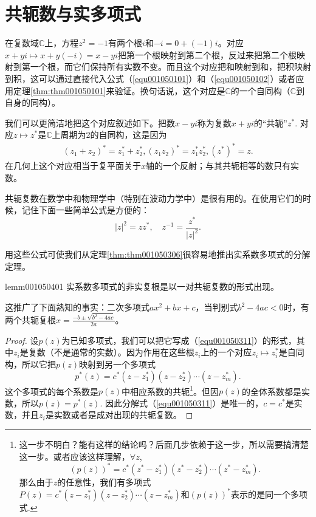 \section{共轭数与实多项式}\label{section0010504}
在复数域$\mathbb{C}$上，方程$z^2=-1$有两个根$i$和$-i=0+(-1)i$。对应$x+yi \mapsto x+y(-i)=x-yi$把第一个根映射到第二个根，反过来把第二个根映射到第一个根，而它们保持所有实数不变。而且这个对应把和映射到和，把积映射到积，这可以通过直接代入公式（\ref{equ001050101}）和（\ref{equ001050102}）或者应用定理\ref{thm:thm001050101}来验证。换句话说，这个对应是$\mathbb{C}$的一个自同构（$\mathbb{C}$到自身的同构）。

我们可以更简洁地把这个对应叙述如下。把数$x-yi$称为复数$x+yi$的“共轭”$z^*$. 对应$z \mapsto z^*$是$\mathbb{C}$上周期为2的自同构，这是因为
\begin{gather}\label{equ001050412}
(z_1 + z_2)^* = z_1^* + z_2^*, (z_1z_2)^*=z_1^*z_2^*, (z^*)^* = z.
\end{gather}
在几何上这个对应相当于复平面关于$x$轴的一个反射；与其共轭相等的数只有实数。

共轭复数在数学中和物理学中（特别在波动力学中）是很有用的。在使用它们的时候，记住下面一些简单公式是方便的：
\[
|z|^2=zz^*, \quad z^{-1} = \frac{z^*}{|z|^2}.
\]

用这些公式可使我们从定理\ref{thm:thm001050306}很容易地推出实系数多项式的分解定理。

\begin{lemma}{}{lemm001050401}
实系数多项式的非实复根是以一对共轭复数的形式出现。
\end{lemma}

这推广了下面熟知的事实：二次多项式$ax^2+bx+c$，当判别式$b^2-4ac<0$时，有两个共轭复根$x = \frac{-b \pm \sqrt{b^2-4ac}}{2a}$。

\begin{proof}
设$p(z)$为已知多项式，我们可以把它写成（\ref{equ001050311}）的形式，其中$z_i$是复数（不是通常的实数）。因为作用在这些根$z_i$上的一个对应$z_i \mapsto z_i^*$是自同构，所以它把$p(z)$映射到另一个多项式
\[
p^*(z) = c^*(z-z_1^*)(z-z_2^*)\cdots(z-z_m^*).
\]
这个多项式的每个系数是$p(z)$中相应系数的共轭\footnote{这一步不明白？能有这样的结论吗？后面几步依赖于这一步，所以需要搞清楚这一步。或者应该这样理解，$\forall z$, \[(p(z))^*=c^*(z^*-z_1^*)(z^*-z_2^*)\cdots(z^*-z_m^*).\]那么由于$z$的任意性，我们有多项式$P(z) = c^*(z-z_1^*)(z-z_2^*)\cdots(z-z_m^*)$和$(p(z))^*$表示的是同一个多项式.}。但因$p(z)$的全体系数都是实数，所以$p(z)=p^*(z)$. 因此分解式（\ref{equ001050311}）是唯一的，$c=c^*$是实数，并且$z_i$是实数或者是成对出现的共轭复数。
\end{proof}

